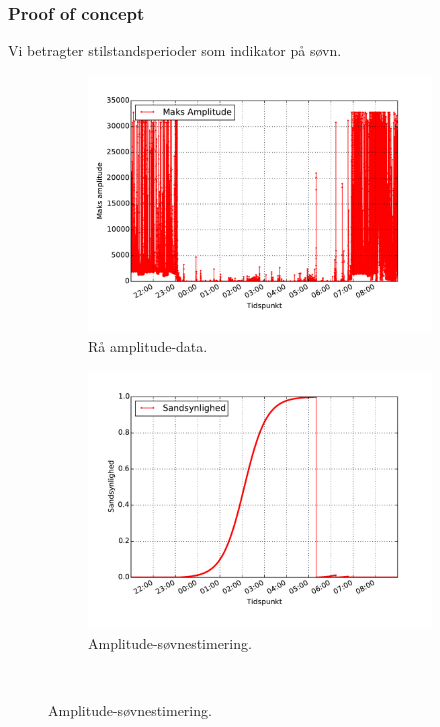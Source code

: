 \begin{frame}
\frametitle{Proof of concept}
Vi betragter stilstandsperioder som indikator på søvn.

\begin{figure}
	\begin{minipage}{\linewidth}
		\begin{subfigure}{0.5\linewidth}
			\centering
			\includegraphics[scale=0.27, trim = 1cm 1cm 1cm 1cm, clip]{../Report/grafik/kombi_figur/amplitude-plot}
			\caption{Rå amplitude-data.}
		\end{subfigure}
		\begin{subfigure}{0.5\linewidth}
			\centering
			\includegraphics[scale=0.27, trim = 1cm 1cm 1cm 1cm, clip]{../Report/grafik/kombi_figur/amplitude-sleep-estimate-plot}
			\caption{Amplitude-søvnestimering.}
		\end{subfigure}
	\end{minipage}\\[1ex]%
\end{figure}

\end{frame}

